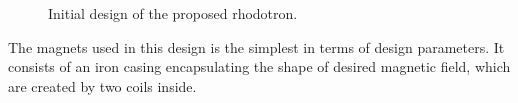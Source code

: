 \documentclass{article}
\begin{document}
\vspace{20pt}
\begin{figure}[H]
    \centering
    \qquad{}%
    \vspace{20pt}
    \caption{\centering Initial design of the proposed rhodotron.} 
    \label{fig:initial_design_cross_section}
\end{figure}
The magnets used in this design is the simplest in terms of design parameters. It consists of an iron casing encapsulating the shape of desired magnetic field, which are created by two coils inside.
\end{document}
